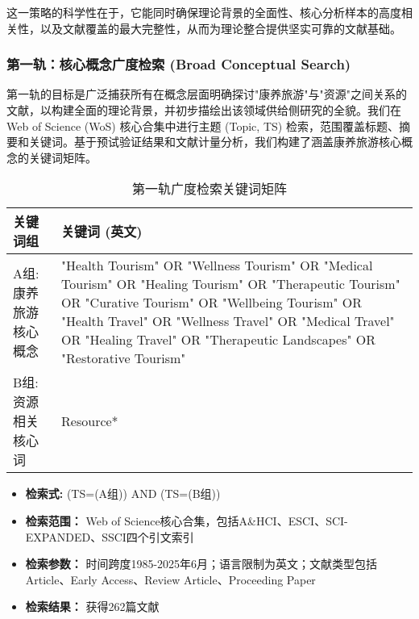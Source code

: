 \documentclass[UTF8, 12pt, a4paper, twoside]{ctexart}
\begin{document}
这一策略的科学性在于，它能同时确保理论背景的全面性、核心分析样本的高度相关性，以及文献覆盖的最大完整性，从而为理论整合提供坚实可靠的文献基础。

\subsubsection{第一轨：核心概念广度检索 (Broad Conceptual Search)}
第一轨的目标是广泛捕获所有在概念层面明确探讨"康养旅游"与"资源"之间关系的文献，以构建全面的理论背景，并初步描绘出该领域供给侧研究的全貌。我们在 Web of Science (WoS) 核心合集中进行主题 (Topic, TS) 检索，范围覆盖标题、摘要和关键词。基于预试验证结果和文献计量分析，我们构建了涵盖康养旅游核心概念的关键词矩阵。

\begin{table}[ht]
	\centering
	\caption{第一轨广度检索关键词矩阵}
	\label{tab:search_matrix_1_method}
	\begin{tabularx}{\textwidth}{lX}
		\toprule
		\textbf{关键词组} & \textbf{关键词 (英文)}                                                                                                                                                                                                                                                                           \\
		\midrule
		A组: 康养旅游核心概念  & "Health Tourism" OR "Wellness Tourism" OR "Medical Tourism" OR "Healing Tourism" OR "Therapeutic Tourism" OR "Curative Tourism" OR "Wellbeing Tourism" OR "Health Travel" OR "Wellness Travel" OR "Medical Travel" OR "Healing Travel" OR "Therapeutic Landscapes" OR "Restorative Tourism" \\
		\addlinespace
		B组: 资源相关核心词   & Resource*                                                                                                                                                                                                                                                                                   \\
		\bottomrule
	\end{tabularx}
\end{table}

\begin{itemize}[leftmargin=*, nosep]
	\item \textbf{检索式:} (TS=(A组)) AND (TS=(B组))
	\item \textbf{检索范围：} Web of Science核心合集，包括A\&HCI、ESCI、SCI-EXPANDED、SSCI四个引文索引
	\item \textbf{检索参数：} 时间跨度1985-2025年6月；语言限制为英文；文献类型包括Article、Early Access、Review Article、Proceeding Paper
	\item \textbf{检索结果：} 获得262篇文献
\end{itemize}
\end{document}
